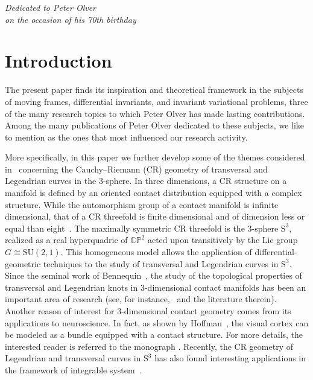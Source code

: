 \documentclass[pdftex]{sigma}
\numberwithin{equation}{section}
\begin{document}

\begin{flushright}
\begin{minipage}{60mm}
\it Dedicated to Peter Olver\\ on the occasion of his 70th birthday
 \end{minipage}
\end{flushright}

\renewcommand{\thefootnote}{\arabic{footnote}}
\setcounter{footnote}{0}

\section{Introduction}%

The present paper finds its inspiration and theoretical framework in
the subjects of moving frames, differential invariants, and invariant variational problems,
three of the many research topics to which Peter Olver has made
lasting contributions.
%
Among the many publications of
Peter Olver dedicated to these subjects, we like to mention
\cite{FelsOlver1, FelsOlver2,Olver-book1,Olver-book2}
as the ones that most influenced
our research activity.

More specifically, in this paper we further develop some of the themes
considered in~\cite{M,MNS-Kharkiv,MS}
concerning the Cauchy--Riemann (CR) geometry of transversal and Legendrian curves in the 3-sphere.
In three dimensions, a CR structure on a manifold is defined by an oriented contact distribution
equipped with a complex structure.
%
While the automorphism group of a contact manifold is infinite dimensional,
that of a CR threefold is finite dimensional and of dimension less or equal than eight~\cite{Cartan1932-2,Cartan1932,ChMo1974}.
The maximally symmetric CR threefold is the 3-sphere ${\mathrm S}^3$, realized as a real hyperquadric of $\mathbb{CP}^2$
acted upon transitively by the Lie group $G \cong \mathrm{SU}(2,1)$.
This homogeneous model allows the application of
differential-geometric techniques to the study of transversal and Legendrian curves in ${\mathrm S}^3$.
Since the seminal work of Bennequin~\cite{Benn1983}, the study of the topological properties of transversal and Legendrian
knots in 3-dimensional contact manifolds has been an important area of research
(see, for instance,~\cite{Eliash1993,Et3,Etn1999, Et2,EtHo,FuTa1997} and the literature therein).
Another reason of interest for 3-dimensional contact geometry
comes from its applications to neuroscience.
In fact, as shown by Hoffman~\cite{Ho}, the visual cortex can be modeled as a bundle equipped with a contact structure.
For more details, the interested reader is referred to the monograph
\cite[Section~5]{Pe}.
Recently, the CR geometry of Legendrian and transversal curves in ${\mathrm S}^3$ has also found
interesting applications in the framework of integrable system~\cite{CI}.
\end{document}
